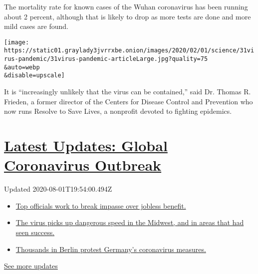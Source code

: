 The mortality rate for known cases of the Wuhan coronavirus has been
running about 2 percent, although that is likely to drop as more tests
are done and more mild cases are found.

\texttt{[image: https://static01.graylady3jvrrxbe.onion/images/2020/02/01/science/31virus-pandemic/31virus-pandemic-articleLarge.jpg?quality=75\\\&auto=webp\\\&disable=upscale]}

It is ``increasingly unlikely that the virus can be contained,'' said
Dr. Thomas R. Frieden, a former director of the Centers for Disease
Control and Prevention who now runs Resolve to Save Lives, a nonprofit
devoted to fighting epidemics.

\hypertarget{latest-updates-global-coronavirus-outbreak}{%
\section{\texorpdfstring{\href{https://www.nytimes3xbfgragh.onion/2020/08/01/world/coronavirus-covid-19.html?action=click\&pgtype=Article\&state=default\&region=MAIN_CONTENT_1\&context=storylines_live_updates}{Latest
Updates: Global Coronavirus
Outbreak}}{Latest Updates: Global Coronavirus Outbreak}}\label{latest-updates-global-coronavirus-outbreak}}

Updated 2020-08-01T19:54:00.494Z

\begin{itemize}
\tightlist
\item
  \href{https://www.nytimes3xbfgragh.onion/2020/08/01/world/coronavirus-covid-19.html?action=click\&pgtype=Article\&state=default\&region=MAIN_CONTENT_1\&context=storylines_live_updates\#link-3ac56579}{Top
  officials work to break impasse over jobless benefit.}
\item
  \href{https://www.nytimes3xbfgragh.onion/2020/08/01/world/coronavirus-covid-19.html?action=click\&pgtype=Article\&state=default\&region=MAIN_CONTENT_1\&context=storylines_live_updates\#link-8796723}{The
  virus picks up dangerous speed in the Midwest, and in areas that had
  seen success.}
\item
  \href{https://www.nytimes3xbfgragh.onion/2020/08/01/world/coronavirus-covid-19.html?action=click\&pgtype=Article\&state=default\&region=MAIN_CONTENT_1\&context=storylines_live_updates\#link-25930521}{Thousands
  in Berlin protest Germany's coronavirus measures.}
\end{itemize}

\href{https://www.nytimes3xbfgragh.onion/2020/08/01/world/coronavirus-covid-19.html?action=click\&pgtype=Article\&state=default\&region=MAIN_CONTENT_1\&context=storylines_live_updates}{See
more updates}

